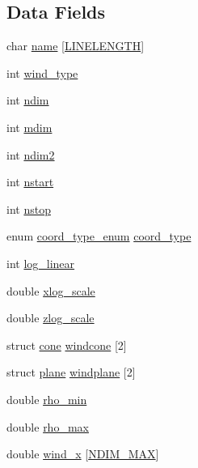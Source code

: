 \subsection*{Data Fields}
\begin{DoxyCompactItemize}
\item 
char \hyperlink{structdomain_a0956e1c9c45266a6512b1571427711f6}{name} \mbox{[}\hyperlink{xlog_8c_a10e8c7b8458375c3dbfbb4010a2aba8c}{L\+I\+N\+E\+L\+E\+N\+G\+TH}\mbox{]}
\item 
int \hyperlink{structdomain_a620d21c9cc0dfcb8ed1d9bbb07314daf}{wind\+\_\+type}
\item 
int \hyperlink{structdomain_ac90e4779abcabc0170d2bfc30a8e1323}{ndim}
\item 
int \hyperlink{structdomain_aa557b63d514dffedaf76a635579b3294}{mdim}
\item 
int \hyperlink{structdomain_a7d98eb17a804f4bc727325545272e3da}{ndim2}
\item 
int \hyperlink{structdomain_aeddcae5f993efc8142ee84f461cfcda1}{nstart}
\item 
int \hyperlink{structdomain_ab3733bfe4bcdd87edd4f59da33e85d46}{nstop}
\item 
enum \hyperlink{python_8h_a0a67e9069ac2a2910ddc33cb34df0566}{coord\+\_\+type\+\_\+enum} \hyperlink{structdomain_acbaa6a69b41c9e7c924b668baa65bad3}{coord\+\_\+type}
\item 
int \hyperlink{structdomain_a8e5c1206fd8d19c47be7b5154b5217b9}{log\+\_\+linear}
\item 
double \hyperlink{structdomain_a9877c9ee2824450fd9107f8b93b4f267}{xlog\+\_\+scale}
\item 
double \hyperlink{structdomain_a8fd2202427974acf456e95506e2dce8e}{zlog\+\_\+scale}
\item 
struct \hyperlink{structcone}{cone} \hyperlink{structdomain_a0e5379ee2681d481ee329735231ced7a}{windcone} \mbox{[}2\mbox{]}
\item 
struct \hyperlink{structplane}{plane} \hyperlink{structdomain_ad59a0e0fc4c056c9b75ff1d1c3a0f06c}{windplane} \mbox{[}2\mbox{]}
\item 
double \hyperlink{structdomain_aa1a157a923d525e54bce851e96f8a19c}{rho\+\_\+min}
\item 
double \hyperlink{structdomain_a073d3b0cd25c68e5c3d4ea22705fd1e0}{rho\+\_\+max}
\item 
double \hyperlink{structdomain_a69ec5690bab03b53d2f061173c6bd6c6}{wind\+\_\+x} \mbox{[}\hyperlink{python_8h_a80cccc8d22c78d3095c60ab2aedeb2a5}{N\+D\+I\+M\+\_\+\+M\+AX}\mbox{]}
\item 

\end{DoxyCompactItemize}
